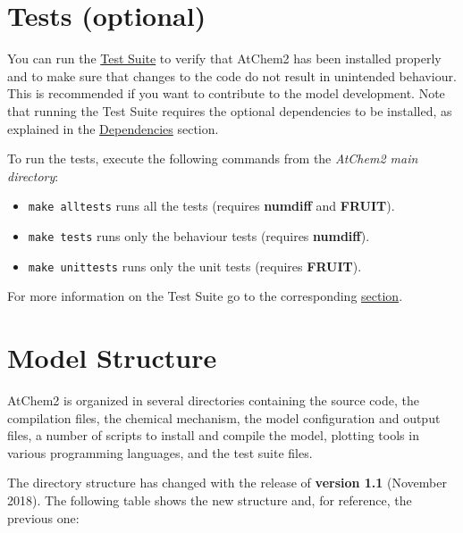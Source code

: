 \section{Tests (optional)} \label{sec:tests}

You can run the \hyperref[sec:testsuite]{Test Suite} to verify that
AtChem2 has been installed properly and to make sure that changes to
the code do not result in unintended behaviour. This is recommended if
you want to contribute to the model development. Note that running the
Test Suite requires the optional dependencies to be installed, as
explained in the \hyperref[sec:dependencies]{Dependencies} section.

To run the tests, execute the following commands from the
\emph{AtChem2 main directory}:

\begin{itemize}
\item \texttt{make\ alltests} runs all the tests (requires
  \textbf{numdiff} and \textbf{FRUIT}).
\item \texttt{make\ tests} runs only the behaviour tests (requires
  \textbf{numdiff}).
\item \texttt{make\ unittests} runs only the unit tests (requires
  \textbf{FRUIT}).
\end{itemize}

For more information on the Test Suite go to the corresponding
\hyperref[sec:testsuite]{section}.

\section{Model Structure} \label{sec:structure}

AtChem2 is organized in several directories containing the source
code, the compilation files, the chemical mechanism, the model
configuration and output files, a number of scripts to install and
compile the model, plotting tools in various programming languages,
and the test suite files.

The directory structure has changed with the release of
\textbf{version 1.1} (November 2018). The following table shows the
new structure and, for reference, the previous one:

